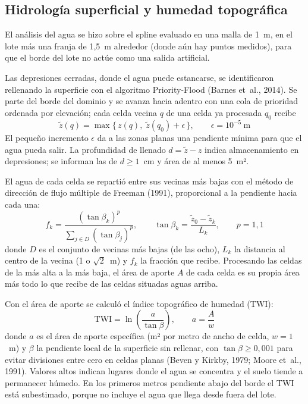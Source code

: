 \documentclass[10pt]{article}
\begin{document}
\subsection{Hidrología superficial y humedad topográfica}\label{sec:met-hidro}
El análisis del agua se hizo sobre el spline evaluado en una malla de 1~m, en el lote más una franja de 1,5~m alrededor
(donde aún hay puntos medidos), para que el borde del lote no actúe como una salida artificial.

Las depresiones cerradas, donde el agua puede estancarse, se identificaron rellenando la superficie con el algoritmo
Priority-Flood (Barnes et~al., 2014). Se parte del borde del dominio y se avanza hacia adentro con una cola de
prioridad ordenada por elevación; cada celda vecina \(q\) de una celda ya procesada \(q_0\) recibe
\begin{equation}
  \tilde z(q) = \max\bigl\{\, z(q),\; \tilde z(q_0) + \epsilon \,\bigr\}, \qquad \epsilon = 10^{-5}~\text{m}
  \label{eq:pflood}
\end{equation}
El pequeño incremento \(\epsilon\) da a las zonas planas una pendiente mínima para que el agua pueda salir. La
profundidad de llenado \(d = \tilde z - z\) indica almacenamiento en depresiones; se informan las de
\(d \ge 1\)~cm y área de al menos 5~m².

El agua de cada celda se repartió entre sus vecinas más bajas con el método de dirección de flujo múltiple de Freeman
(1991), proporcional a la pendiente hacia cada una:
\begin{equation}
  f_k = \frac{(\tan\beta_k)^{p}}{\sum_{j\in D}(\tan\beta_j)^{p}}, \qquad
  \tan\beta_k = \frac{\tilde z_0 - \tilde z_k}{L_k}, \qquad p = 1{,}1
  \label{eq:mfd}
\end{equation}
donde \(D\) es el conjunto de vecinas más bajas (de las ocho), \(L_k\) la distancia al centro de la vecina (1 o
\(\sqrt{2}\)~m) y \(f_k\) la fracción que recibe. Procesando las celdas de la más alta a la más baja, el área de aporte
\(A\) de cada celda es su propia área más todo lo que recibe de las celdas situadas aguas arriba.

Con el área de aporte se calculó el índice topográfico de humedad (TWI):
\begin{equation}
  \mathrm{TWI} = \ln\!\left(\frac{a}{\tan\beta}\right), \qquad a = \frac{A}{w}
  \label{eq:twi}
\end{equation}
donde \(a\) es el área de aporte específica (m² por metro de ancho de celda, \(w = 1\)~m) y \(\beta\) la pendiente
local de la superficie sin rellenar, con \(\tan\beta \ge 0{,}001\) para evitar divisiones entre cero en celdas planas
(Beven y Kirkby, 1979; Moore et~al., 1991). Valores altos indican lugares donde el agua se concentra y el suelo tiende
a permanecer húmedo. En los primeros metros pendiente abajo del borde el TWI está subestimado, porque no incluye el
agua que llega desde fuera del lote.
\end{document}
